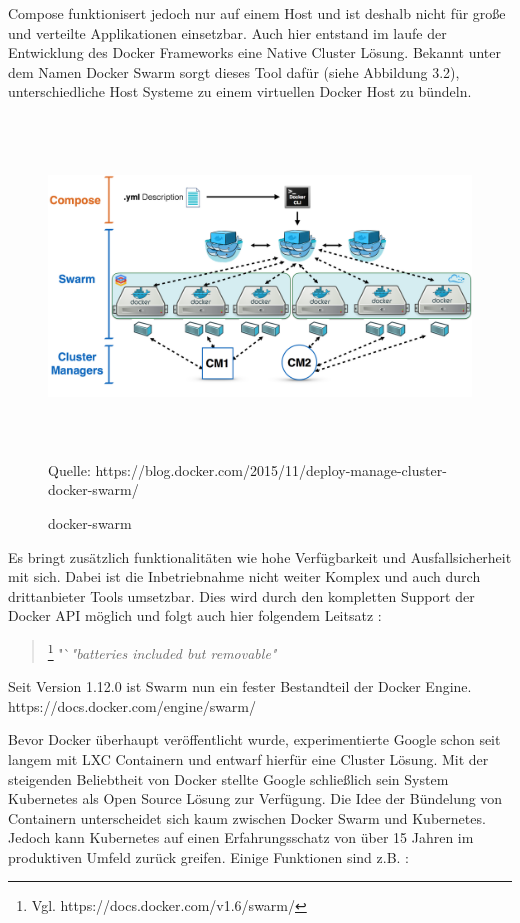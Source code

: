 \documentclass[12pt,toc=bib,toc=listof]{scrreprt}
\begin{document}
Compose funktionisert jedoch nur auf einem Host und ist deshalb nicht für große und verteilte Applikationen einsetzbar.
Auch hier entstand im laufe der Entwicklung des Docker Frameworks eine Native Cluster Lösung.
Bekannt unter dem Namen Docker Swarm sorgt dieses Tool dafür (siehe Abbildung 3.2), unterschiedliche Host Systeme zu einem virtuellen Docker Host zu bündeln.


\begin{figure}
	\centering
	\caption{docker-swarm}
	\includegraphics[width=15cm, height=9cm, scale=0.3]{docker-swarm.png}
	Quelle: https://blog.docker.com/2015/11/deploy-manage-cluster-docker-swarm/
\end{figure}

Es bringt zusätzlich funktionalitäten wie hohe Verfügbarkeit und Ausfallsicherheit mit sich.
Dabei ist die Inbetriebnahme nicht weiter Komplex und auch durch drittanbieter Tools umsetzbar.
Dies wird durch den kompletten Support der Docker API möglich und folgt auch hier folgendem Leitsatz :

\begin{quote}
	\footnote[1]{Vgl. https://docs.docker.com/v1.6/swarm/}
	"`\textit{"batteries included but removable"}
\end{quote}

Seit Version 1.12.0 ist Swarm nun ein fester Bestandteil der Docker Engine.
https://docs.docker.com/engine/swarm/

Bevor Docker überhaupt veröffentlicht wurde, experimentierte Google schon seit langem mit LXC Containern und entwarf hierfür eine Cluster Lösung.
Mit der steigenden Beliebtheit von Docker stellte Google schließlich sein System Kubernetes als Open Source Lösung zur Verfügung.
Die Idee der Bündelung von Containern unterscheidet sich kaum zwischen Docker Swarm und Kubernetes.
Jedoch kann Kubernetes auf einen Erfahrungsschatz von über 15 Jahren im produktiven Umfeld zurück greifen.
Einige Funktionen sind z.B. :
\end{document}
